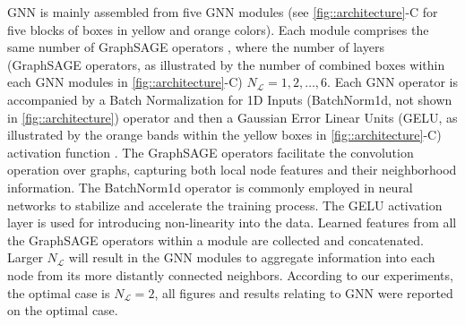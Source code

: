 {GNN is mainly assembled from five GNN modules (see \autoref{fig::architecture}-C for five blocks of boxes in yellow and orange colors). Each module comprises the same number of GraphSAGE operators \citep{hamilton_inductive_2017}, where the number of layers (GraphSAGE operators, as illustrated by the number of combined boxes within each GNN modules in \autoref{fig::architecture}-C) $N_{\mathcal{L}} = 1, 2, \ldots, 6$. Each GNN operator is accompanied by a Batch Normalization for 1D Inputs (BatchNorm1d, not shown in \autoref{fig::architecture}) operator \citep{ioffe_batch_2015} and then a Gaussian Error Linear Units (GELU, as illustrated by the orange bands within the yellow boxes in \autoref{fig::architecture}-C) activation function \citep{hendrycks_gaussian_2016}. The GraphSAGE operators facilitate the convolution operation over graphs, capturing both local node features and their neighborhood information. The BatchNorm1d operator is commonly employed in neural networks to stabilize and accelerate the training process. The GELU activation layer is used for introducing non-linearity into the data. Learned features from all the GraphSAGE operators within a module are collected and concatenated. Larger $N_{\mathcal{L}}$ will result in the GNN modules to aggregate information into each node from its more distantly connected neighbors. According to our experiments, the optimal case is $N_{\mathcal{L}} = 2$, all figures and results relating to GNN were reported on the optimal case.

}
